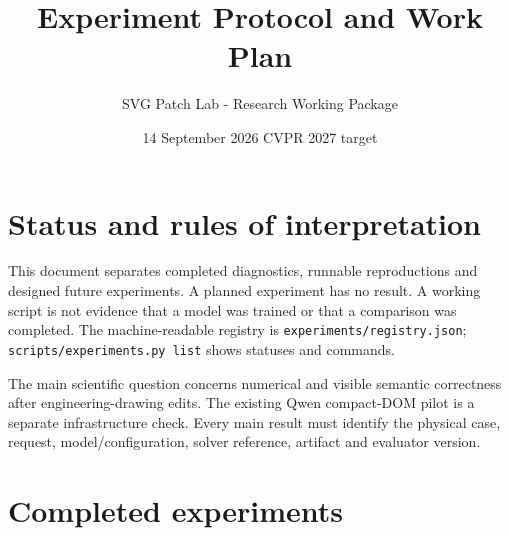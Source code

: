 \documentclass[
  11pt,
  a4paper,
]{article}
\title{Experiment Protocol and Work Plan}
\author{SVG Patch Lab - Research Working Package}
\date{14 September 2026 \textbar{} CVPR 2027 target}
\let\originaltableofcontents\tableofcontents
\renewcommand{\tableofcontents}{\originaltableofcontents\clearpage}
\begin{document}
\maketitle

{
\setcounter{tocdepth}{2}
\tableofcontents
}
\section{Status and rules of
interpretation}\label{status-and-rules-of-interpretation}

This document separates completed diagnostics, runnable reproductions
and designed future experiments. A planned experiment has no result. A
working script is not evidence that a model was trained or that a
comparison was completed. The machine-readable registry is
\texttt{experiments/registry.json};
\texttt{scripts/experiments.py\ list} shows statuses and commands.

The main scientific question concerns numerical and visible semantic
correctness after engineering-drawing edits. The existing Qwen
compact-DOM pilot is a separate infrastructure check. Every main result
must identify the physical case, request, model/configuration, solver
reference, artifact and evaluator version.

\section{Completed experiments}\label{completed-experiments}
\end{document}
